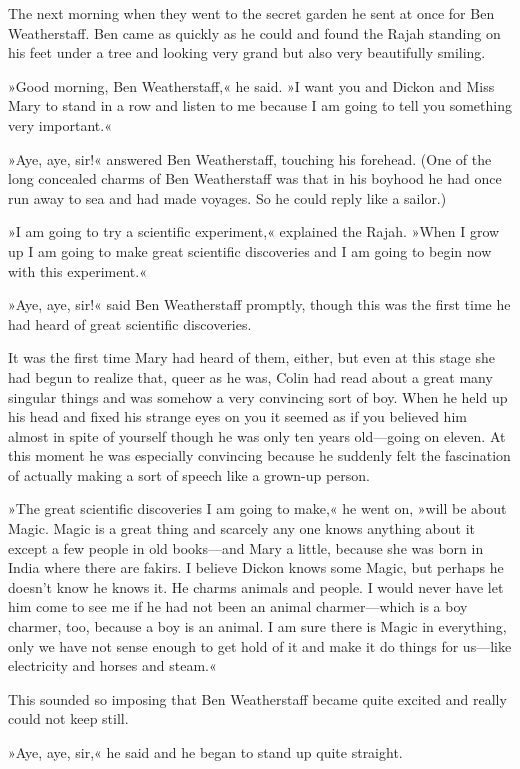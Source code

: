 The next morning when they went to the secret garden he sent at once for Ben Weatherstaff. Ben came as quickly as he could and found the Rajah standing on his feet under a tree and looking very grand but also very beautifully smiling.

»Good morning, Ben Weatherstaff,« he said. »I want you and Dickon and Miss Mary to stand in a row and listen to me because I am going to tell you something very important.«

»Aye, aye, sir!« answered Ben Weatherstaff, touching his forehead. (One of the long concealed charms of Ben Weatherstaff was that in his boyhood he had once run away to sea and had made voyages. So he could reply like a sailor.)

»I am going to try a scientific experiment,« explained the Rajah. »When I grow up I am going to make great scientific discoveries and I am going to begin now with this experiment.«

»Aye, aye, sir!« said Ben Weatherstaff promptly, though this was the first time he had heard of great scientific discoveries.

It was the first time Mary had heard of them, either, but even at this stage she had begun to realize that, queer as he was, Colin had read about a great many singular things and was somehow a very convincing sort of boy. When he held up his head and fixed his strange eyes on you it seemed as if you believed him almost in spite of yourself though he was only ten years old—going on eleven. At this moment he was especially convincing because he suddenly felt the fascination of actually making a sort of speech like a grown-up person.

»The great scientific discoveries I am going to make,« he went on, »will be about Magic. Magic is a great thing and scarcely any one knows anything about it except a few people in old books—and Mary a little, because she was born in India where there are fakirs. I believe Dickon knows some Magic, but perhaps he doesn't know he knows it. He charms animals and people. I would never have let him come to see me if he had not been an animal charmer—which is a boy charmer, too, because a boy is an animal. I am sure there is Magic in everything, only we have not sense enough to get hold of it and make it do things for us—like electricity and horses and steam.«

This sounded so imposing that Ben Weatherstaff became quite excited and really could not keep still.

»Aye, aye, sir,« he said and he began to stand up quite straight.

